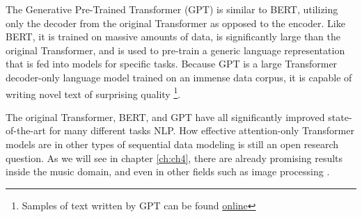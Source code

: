 The Generative Pre-Trained Transformer (GPT) is similar to BERT, utilizing only the decoder from the original Transformer as opposed to the encoder. Like BERT, it is trained on massive amounts of data, is significantly large than the original Transformer, and is used to pre-train a generic language representation that is fed into models for specific tasks. Because GPT is a large Transformer decoder-only language model trained on an immense data corpus, it is capable of writing novel text of surprising quality \footnote{Samples of text written by GPT can be found \href{https://openai.com/blog/better-language-models/}{online}}. 


The original Transformer, BERT, and GPT have all significantly improved state-of-the-art for many different tasks NLP. How effective attention-only Transformer models are in other types of sequential data modeling is still an open research question. As we will see in chapter \ref{ch:ch4}, there are already promising results inside the music domain, and even in other fields such as image processing \cite{dosovitskiy2020image}. 


 